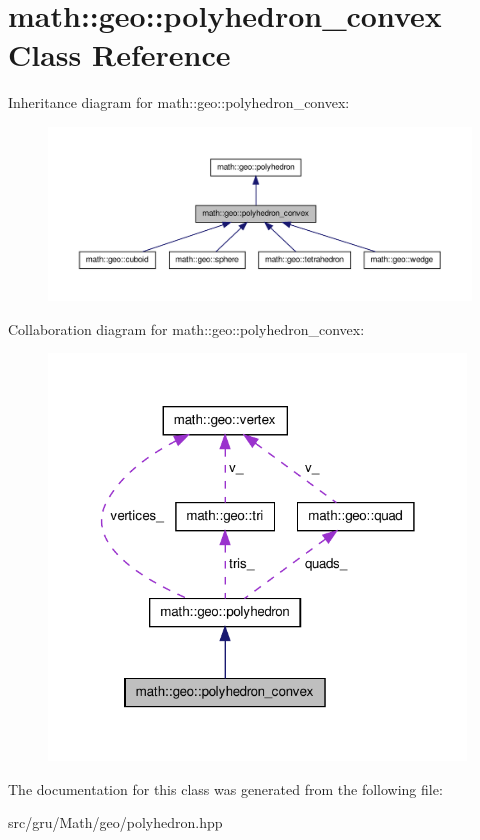 \hypertarget{classmath_1_1geo_1_1polyhedron__convex}{\section{math\-:\-:geo\-:\-:polyhedron\-\_\-convex \-Class \-Reference}
\label{classmath_1_1geo_1_1polyhedron__convex}
}


\-Inheritance diagram for math\-:\-:geo\-:\-:polyhedron\-\_\-convex\-:\nopagebreak
\begin{figure}[H]
\begin{center}
\leavevmode
\includegraphics[width=350pt]{classmath_1_1geo_1_1polyhedron__convex__inherit__graph}
\end{center}
\end{figure}


\-Collaboration diagram for math\-:\-:geo\-:\-:polyhedron\-\_\-convex\-:\nopagebreak
\begin{figure}[H]
\begin{center}
\leavevmode
\includegraphics[width=314pt]{classmath_1_1geo_1_1polyhedron__convex__coll__graph}
\end{center}
\end{figure}


\-The documentation for this class was generated from the following file\-:\begin{DoxyCompactItemize}
\item 
src/gru/\-Math/geo/polyhedron.\-hpp\end{DoxyCompactItemize}
